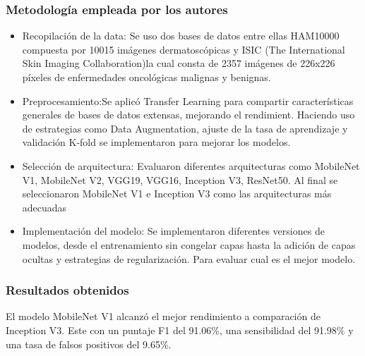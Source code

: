 \subsubsection{Metodología empleada por los autores}
\newcommand{\MEDone}{Recopilación de la data: Se uso dos bases de datos entre ellas HAM10000 compuesta por 10015 imágenes dermatoscópicas y ISIC (The International Skin Imaging Collaboration)la cual consta de 2357 imágenes de 226x226 píxeles de enfermedades oncológicas malignas y benignas.
}
\newcommand{\MEDtwo}{ Preprocesamiento:Se aplicó Transfer Learning para compartir características generales de bases de datos extensas, mejorando el rendimient. Haciendo uso de estrategias como Data Augmentation, ajuste de la tasa de aprendizaje y validación K-fold se implementaron para mejorar los modelos.
}

\newcommand{\MEDthree}{ Selección de arquitectura: Evaluaron diferentes arquitecturas como MobileNet V1, MobileNet V2, VGG19, VGG16, Inception V3, ResNet50. 
Al final se seleccionaron MobileNet V1 e Inception V3 como las arquitecturas más adecuadas
}

\newcommand{\MEDfour}{Implementación del modelo: Se implementaron diferentes versiones de modelos, desde el entrenamiento sin congelar capas hasta la adición de capas ocultas y estrategias de regularización. Para evaluar cual es el mejor modelo.
}


\begin{itemize}
	\item \MEDone
	\item \MEDtwo
	\item \MEDthree
	\item \MEDfour
\end{itemize}

\subsubsection{Resultados obtenidos}
El modelo MobileNet V1 alcanzó el mejor rendimiento a comparación de Inception V3. Este con un puntaje F1 del 91.06\%, una sensibilidad del 91.98\% y una tasa de falsos positivos del 9.65\%. 


